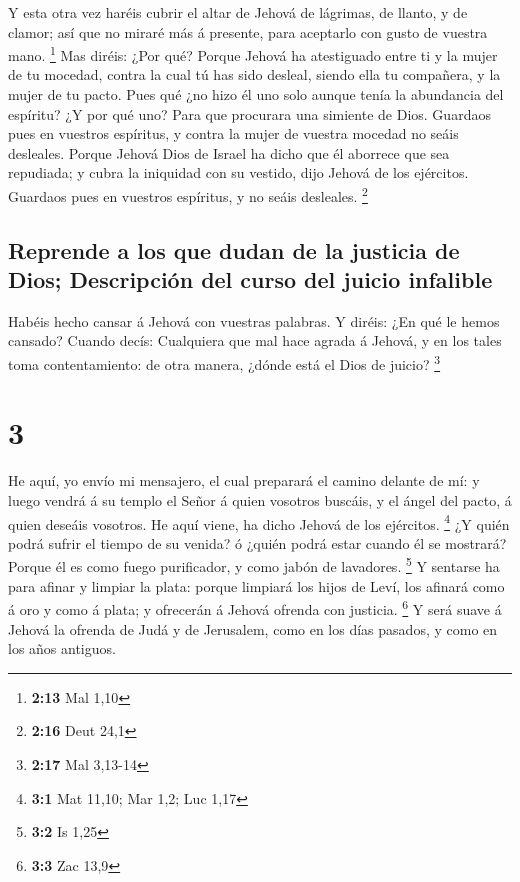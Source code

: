  Y esta otra vez haréis cubrir el altar de Jehová de
lágrimas, de llanto, y de clamor; así que no miraré más á presente, para
aceptarlo con gusto de vuestra mano. \footnote{\textbf{2:13} Mal 1,10}
 Mas diréis: ¿Por qué? Porque Jehová ha atestiguado entre
ti y la mujer de tu mocedad, contra la cual tú has sido desleal, siendo
ella tu compañera, y la mujer de tu pacto.  Pues qué ¿no
hizo él uno solo aunque tenía la abundancia del espíritu? ¿Y por qué
uno? Para que procurara una simiente de Dios. Guardaos pues en vuestros
espíritus, y contra la mujer de vuestra mocedad no seáis desleales.
 Porque Jehová Dios de Israel ha dicho que él aborrece
que sea repudiada; y cubra la iniquidad con su vestido, dijo Jehová de
los ejércitos. Guardaos pues en vuestros espíritus, y no seáis
desleales. \footnote{\textbf{2:16} Deut 24,1}

\hypertarget{reprende-a-los-que-dudan-de-la-justicia-de-dios-descripciuxf3n-del-curso-del-juicio-infalible}{%
\subsection{Reprende a los que dudan de la justicia de Dios; Descripción
del curso del juicio
infalible}\label{reprende-a-los-que-dudan-de-la-justicia-de-dios-descripciuxf3n-del-curso-del-juicio-infalible}}

 Habéis hecho cansar á Jehová con vuestras palabras. Y
diréis: ¿En qué le hemos cansado? Cuando decís: Cualquiera que mal hace
agrada á Jehová, y en los tales toma contentamiento: de otra manera,
¿dónde está el Dios de juicio? \footnote{\textbf{2:17} Mal 3,13-14}

\hypertarget{section-2}{%
\section{3}\label{section-2}}

 He aquí, yo envío mi mensajero, el cual preparará el
camino delante de mí: y luego vendrá á su templo el Señor á quien
vosotros buscáis, y el ángel del pacto, á quien deseáis vosotros. He
aquí viene, ha dicho Jehová de los ejércitos. \footnote{\textbf{3:1} Mat
  11,10; Mar 1,2; Luc 1,17}  ¿Y quién podrá sufrir el
tiempo de su venida? ó ¿quién podrá estar cuando él se mostrará? Porque
él es como fuego purificador, y como jabón de lavadores. \footnote{\textbf{3:2}
  Is 1,25}  Y sentarse ha para afinar y limpiar la plata:
porque limpiará los hijos de Leví, los afinará como á oro y como á
plata; y ofrecerán á Jehová ofrenda con justicia. \footnote{\textbf{3:3}
  Zac 13,9}  Y será suave á Jehová la ofrenda de Judá y de
Jerusalem, como en los días pasados, y como en los años antiguos.

